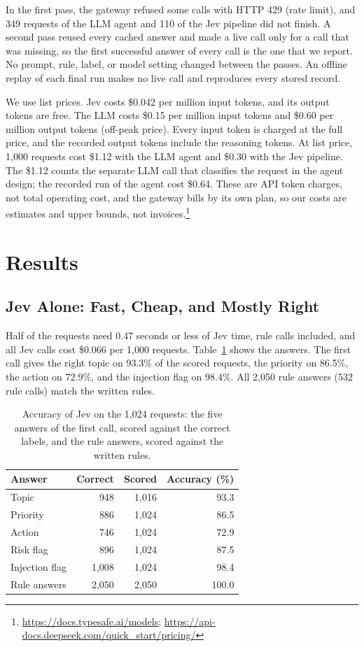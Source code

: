 \documentclass[sigconf,nonacm]{acmart}
\begin{document}
In the first pass, the gateway refused some calls with HTTP 429 (rate limit), and 349 requests of the LLM agent and 110 of the Jev pipeline did not finish. A second pass reused every cached answer and made a live call only for a call that was missing, so the first successful answer of every call is the one that we report. No prompt, rule, label, or model setting changed between the passes. An offline replay of each final run makes no live call and reproduces every stored record.

We use list prices. Jev costs \$0.042 per million input tokens, and its output tokens are free. The LLM costs \$0.15 per million input tokens and \$0.60 per million output tokens (off-peak price). Every input token is charged at the full price, and the recorded output tokens include the reasoning tokens. At list price, 1,000 requests cost \$1.12 with the LLM agent and \$0.30 with the Jev pipeline. The \$1.12 counts the separate LLM call that classifies the request in the agent design; the recorded run of the agent cost \$0.64. These are API token charges, not total operating cost, and the gateway bills by its own plan, so our costs are estimates and upper bounds, not invoices.\footnote{\url{https://docs.typesafe.ai/models}; \url{https://api-docs.deepseek.com/quick_start/pricing/}}

\section{Results}\label{sec:results}

\subsection{Jev Alone: Fast, Cheap, and Mostly Right}\label{sec:classifier}

Half of the requests need 0.47 seconds or less of Jev time, rule calls included, and all Jev calls cost \$0.066 per 1,000 requests. Table~\ref{tab:jev} shows the answers. The first call gives the right topic on 93.3\% of the scored requests, the priority on 86.5\%, the action on 72.9\%, and the injection flag on 98.4\%. All 2,050 rule answers (532 rule calls) match the written rules.

\begin{table}[t]
\caption{Accuracy of Jev on the 1,024 requests: the five answers of the first call, scored against the correct labels, and the rule answers, scored against the written rules.}
\label{tab:jev}
\footnotesize
\setlength{\tabcolsep}{4pt}
\begin{tabular}{@{}lrrr@{}}
\toprule
Answer & Correct & Scored & Accuracy (\%) \\
\midrule
Topic & 948 & 1,016 & 93.3 \\
Priority & 886 & 1,024 & 86.5 \\
Action & 746 & 1,024 & 72.9 \\
Risk flag & 896 & 1,024 & 87.5 \\
Injection flag & 1,008 & 1,024 & 98.4 \\
Rule answers & 2,050 & 2,050 & 100.0 \\
\bottomrule
\end{tabular}
\end{table}
\end{document}
